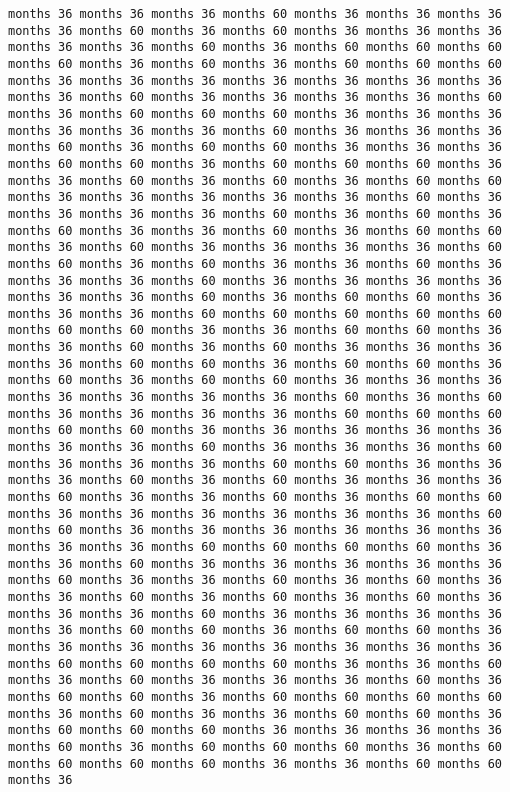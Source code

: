 \documentclass[11pt]{article}
\begin{document}
\begin{Verbatim}[commandchars=\\\{\}, frame=single, framerule=2mm, rulecolor=\color{outerrorbackground}]
months 36 months 36 months 36 months 60 months 36 months 36 months 36 months 36 months 60 months 36 months 60 months 36 months 36 months 36 months 36 months 36 months 60 months 36 months 60 months 60 months 60 months 60 months 36 months 60 months 36 months 60 months 60 months 60 months 36 months 36 months 36 months 36 months 36 months 36 months 36 months 36 months 60 months 36 months 36 months 36 months 36 months 60 months 36 months 60 months 60 months 60 months 36 months 36 months 36 months 36 months 36 months 36 months 60 months 36 months 36 months 36 months 60 months 36 months 60 months 60 months 36 months 36 months 36 months 60 months 60 months 36 months 60 months 60 months 60 months 36 months 36 months 60 months 36 months 60 months 36 months 60 months 60 months 36 months 36 months 36 months 36 months 36 months 60 months 36 months 36 months 36 months 36 months 60 months 36 months 60 months 36 months 60 months 36 months 36 months 60 months 36 months 60 months 60 months 36 months 60 months 36 months 36 months 36 months 36 months 60 months 60 months 36 months 60 months 36 months 36 months 60 months 36 months 36 months 36 months 60 months 36 months 36 months 36 months 36 months 36 months 36 months 60 months 36 months 60 months 60 months 36 months 36 months 36 months 60 months 60 months 60 months 60 months 60 months 60 months 60 months 36 months 36 months 60 months 60 months 36 months 36 months 60 months 36 months 60 months 36 months 36 months 36 months 36 months 60 months 60 months 36 months 60 months 60 months 36 months 60 months 36 months 60 months 60 months 36 months 36 months 36 months 36 months 36 months 36 months 36 months 60 months 36 months 60 months 36 months 36 months 36 months 36 months 60 months 60 months 60 months 60 months 60 months 36 months 36 months 36 months 36 months 36 months 36 months 36 months 60 months 36 months 36 months 36 months 60 months 36 months 36 months 36 months 60 months 60 months 36 months 36 months 36 months 60 months 36 months 60 months 36 months 36 months 36 months 60 months 36 months 36 months 60 months 36 months 60 months 60 months 36 months 36 months 36 months 36 months 36 months 36 months 60 months 60 months 36 months 36 months 36 months 36 months 36 months 36 months 36 months 36 months 60 months 60 months 60 months 60 months 36 months 36 months 60 months 36 months 36 months 36 months 36 months 36 months 60 months 36 months 36 months 60 months 36 months 60 months 36 months 36 months 60 months 36 months 60 months 36 months 60 months 36 months 36 months 36 months 60 months 36 months 36 months 36 months 36 months 36 months 60 months 60 months 36 months 60 months 60 months 36 months 36 months 36 months 36 months 36 months 36 months 36 months 36 months 60 months 60 months 60 months 60 months 36 months 36 months 60 months 36 months 60 months 36 months 36 months 36 months 60 months 36 months 60 months 60 months 36 months 60 months 60 months 60 months 60 months 36 months 60 months 36 months 36 months 60 months 60 months 36 months 60 months 60 months 60 months 36 months 36 months 36 months 36 months 60 months 36 months 60 months 60 months 60 months 36 months 60 months 60 months 60 months 60 months 36 months 36 months 60 months 60 months 36 
\end{Verbatim}
\end{document}
